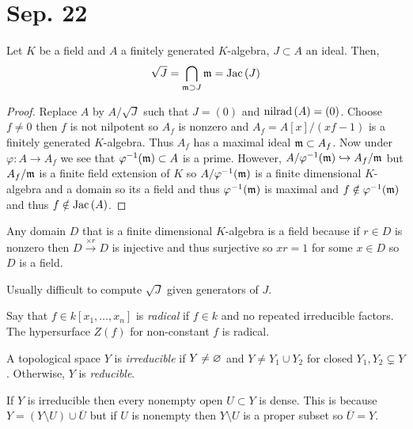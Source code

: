 \documentclass[12pt]{article}
\begin{document}
\section{Sep. 22}

\begin{prop}
Let $K$ be a field and $A$ a finitely generated $K$-algebra, $J \subset A$ an ideal. Then,
\[ \sqrt{J} = \bigcap_{\mathfrak{m} \supset J} \mathfrak{m} = \mathrm{Jac}\left( J \right) \]
\end{prop}

\begin{proof}
Replace $A$ by $A / \sqrt{J}$ such that $J = (0)$ and $\mathrm{nilrad}\left( A \right) = (0)$. Choose $f \neq 0$ then $f$ is not nilpotent so $A_f$ is nonzero and $A_f = A[x]/(xf - 1)$ is a finitely generated $K$-algebra. Thus $A_f$ has a maximal ideal $\mathfrak{m} \subset A_f$. Now under $\varphi : A \to A_f$ we see that $\varphi^{-1}(\mathfrak{m}) \subset A$ is a prime. However, $A / \varphi^{-1}(\mathfrak{m}) \hookrightarrow A_f / \mathfrak{m}$ but $A_f / \mathfrak{m}$ is a finite field extension of $K$ so $A / \varphi^{-1}(\mathfrak{m})$ is a finite dimensional $K$-algebra and a domain so its a field and thus $\varphi^{-1}(\mathfrak{m})$ is maximal and $f \notin \varphi^{-1}(\mathfrak{m})$ and thus $f \notin \mathrm{Jac}\left( A \right)$.  
\end{proof}

\begin{rmk}
Any domain $D$ that is a finite dimensional $K$-algebra is a field because if $r \in D$ is nonzero then $D \xrightarrow{\times r} D$ is injective and thus surjective so $xr = 1$ for some $x \in D$ so $D$ is a field.
\end{rmk}

\begin{rmk}
Usually difficult to compute $\sqrt{J}$ given generators of $J$. 
\end{rmk}

\begin{defn}
Say that $f \in k[x_1, \dots, x_n]$ is \textit{radical} if $f \in k$ and no repeated irreducible factors. The hypersurface $Z(f)$ for non-constant $f$ is radical.
\end{defn}

\begin{defn}
A topological space $Y$ is \textit{irreducible} if $Y \neq \varnothing$ and $Y \neq Y_1 \cup Y_2$ for closed $Y_1, Y_2 \subsetneq Y$. Otherwise, $Y$ is \textit{reducible}.
\end{defn}

\begin{rmk}
If $Y$ is irreducible then every nonempty open $U \subset Y$ is dense. This is because $Y = (Y \setminus U) \cup \overline{U}$ but if $U$ is nonempty then $Y \setminus U$ is a proper subset so $\overline{U} = Y$.
\end{rmk}
\end{document}

